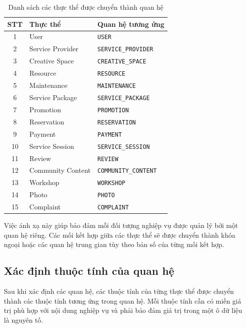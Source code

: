 \begin{table}[htbp]
\centering

\begin{tabular}{|c|l|l|}
\hline
\textbf{STT} & \textbf{Thực thể} & \textbf{Quan hệ tương ứng} \\
\hline
1 & User & \texttt{USER} \\
\hline
2 & Service Provider & \texttt{SERVICE\_PROVIDER} \\
\hline
3 & Creative Space & \texttt{CREATIVE\_SPACE} \\
\hline
4 & Resource & \texttt{RESOURCE} \\
\hline
5 & Maintenance & \texttt{MAINTENANCE} \\
\hline
6 & Service Package & \texttt{SERVICE\_PACKAGE} \\
\hline
7 & Promotion & \texttt{PROMOTION} \\
\hline
8 & Reservation & \texttt{RESERVATION} \\
\hline
9 & Payment & \texttt{PAYMENT} \\
\hline
10 & Service Session & \texttt{SERVICE\_SESSION} \\
\hline
11 & Review & \texttt{REVIEW} \\
\hline
12 & Community Content & \texttt{COMMUNITY\_CONTENT} \\
\hline
13 & Workshop & \texttt{WORKSHOP} \\
\hline
14 & Photo & \texttt{PHOTO} \\
\hline
15 & Complaint & \texttt{COMPLAINT} \\
\hline
\end{tabular}
\caption{Danh sách các thực thể được chuyển thành quan hệ}
\end{table}

Việc ánh xạ này giúp bảo đảm mỗi đối tượng nghiệp vụ được quản lý bởi một quan hệ riêng. Các mối kết hợp giữa các thực thể sẽ được chuyển thành khóa ngoại hoặc các quan hệ trung gian tùy theo bản số của từng mối kết hợp.

\subsection{Xác định thuộc tính của quan hệ}

Sau khi xác định các quan hệ, các thuộc tính của từng thực thể được chuyển thành các thuộc tính tương ứng trong quan hệ. Mỗi thuộc tính cần có miền giá trị phù hợp với nội dung nghiệp vụ và phải bảo đảm giá trị trong một ô dữ liệu là nguyên tố.

